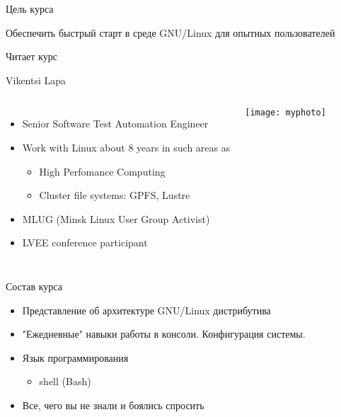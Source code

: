 \begin{frame}{Цель курса}
	\begin{center}
		\Huge
		Обеспечить быстрый старт в среде GNU/Linux для опытных пользователей
	\end{center}
\end{frame}

\begin{frame}{Читает курс}

    \large Vikentsi Lapa 
    \begin{columns}
            \begin{itemize}
                \item Senior Software Test Automation Engineer
                \item Work with Linux about 8 years in such areas as
                \begin{itemize}
                    \item High Perfomance Computing
                    \item Cluster file systems: GPFS, Lustre 
                \end{itemize}
                \item MLUG (Minsk Linux User Group Activist)
                \item LVEE conference participant 
            \end{itemize}
            \center\texttt{[image: myphoto]}
    \end{columns}
\end{frame}

\begin{frame}{Состав курса}
	\begin{itemize}
		\item Представление об архитектуре GNU/Linux дистрибутива
			\pause
		\item "Ежедневные" навыки работы в консоли. Конфигурация системы.
			\pause
		\item Язык программирования
			\begin{itemize}
					\item shell (Bash)
			\end{itemize}
			\pause
		\item Все, чего вы не знали и боялись спросить
	\end{itemize}
\end{frame}
